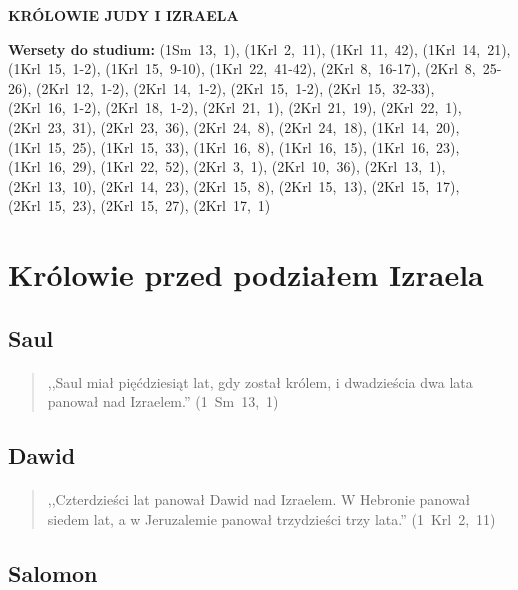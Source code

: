 \documentclass[10pt,a4paper,oneside]{article}
\begin{document}
\centerline{\textbf{\MakeUppercase{Królowie Judy i Izraela}}}
\begin{center}
\textbf{Wersety do studium:} \mbox{(1Sm 13, 1)}, \mbox{(1Krl 2, 11)}, \mbox{(1Krl 11, 42)}, \mbox{(1Krl 14, 21)}, \mbox{(1Krl 15, 1-2)}, \mbox{(1Krl 15, 9-10)}, \mbox{(1Krl 22, 41-42)}, \mbox{(2Krl 8, 16-17)}, \mbox{(2Krl 8, 25-26)}, \mbox{(2Krl 12, 1-2)}, \mbox{(2Krl 14, 1-2)}, \mbox{(2Krl 15, 1-2)}, \mbox{(2Krl 15, 32-33)}, \mbox{(2Krl 16, 1-2)}, \mbox{(2Krl 18, 1-2)}, \mbox{(2Krl 21, 1)}, \mbox{(2Krl 21, 19)}, \mbox{(2Krl 22, 1)}, \mbox{(2Krl 23, 31)}, \mbox{(2Krl 23, 36)}, \mbox{(2Krl 24, 8)}, \mbox{(2Krl 24, 18)}, \mbox{(1Krl 14, 20)}, \mbox{(1Krl 15, 25)}, \mbox{(1Krl 15, 33)}, \mbox{(1Krl 16, 8)}, \mbox{(1Krl 16, 15)}, \mbox{(1Krl 16, 23)}, \mbox{(1Krl 16, 29)}, \mbox{(1Krl 22, 52)}, \mbox{(2Krl 3, 1)}, \mbox{(2Krl 10, 36)}, \mbox{(2Krl 13, 1)}, \mbox{(2Krl 13, 10)}, \mbox{(2Krl 14, 23)}, \mbox{(2Krl 15, 8)}, \mbox{(2Krl 15, 13)}, \mbox{(2Krl 15, 17)}, \mbox{(2Krl 15, 23)}, \mbox{(2Krl 15, 27)}, \mbox{(2Krl 17, 1)}
\end{center}
\section{Królowie przed podziałem Izraela}
\subsection{Saul}
\paragraph{}
\begin{quote}
,,Saul miał pięćdziesiąt lat, gdy został królem, i dwadzieścia dwa lata panował nad Izraelem.'' \mbox{(1 Sm 13, 1)}
\end{quote}
\subsection{Dawid}
\paragraph{}
\begin{quote}
,,Czterdzieści lat panował Dawid nad Izraelem. W Hebronie panował siedem lat, a w Jeruzalemie panował trzydzieści trzy lata.'' \mbox{(1 Krl 2, 11)}
\end{quote}
\subsection{Salomon}
\end{document}
